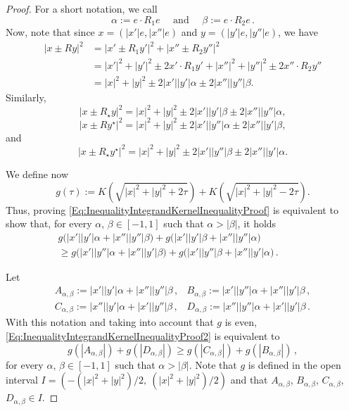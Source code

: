 \documentclass[12pt,reqno]{amsart}
\theoremstyle{definition}
\theoremstyle{remark}
\newcommand{\bpar}[1]{\left ( {#1}\right )}
\numberwithin{equation}{section}
\begin{document}
\begin{proof}
		
		For a short notation, we call
		\begin{equation}
		\label{Eq:DefAlphaBeta}
		\alpha := e \cdot R_1 e  \quad \text{ and } \quad \beta := e \cdot R_2 e\,.
		\end{equation}
		Now, note that since  $x = (|x'|e, |x''|e)$ and $y = (|y'|e, |y''|e)$, we have
		\begin{align*}
		|x \pm Ry|^2&= |x' \pm R_1y'|^2 + |x'' \pm R_2y''|^2 \\
		&= |x'|^2 + |y'|^2 \pm 2 x'\cdot R_1 y' +  |x''|^2 + |y''|^2 \pm 2 x''\cdot R_2 y''\\
		&= |x|^2 + |y|^2 \pm 2 |x'||y'| \alpha \pm 2 |x''||y''| \beta.
		\end{align*}
		Similarly,
		$$
		|x \pm R_\star y|^2 =  |x|^2 + |y|^2 \pm 2 |x'||y'| \beta \pm 2 |x''||y''|\alpha,
		$$
		$$
		|x \pm R y^\star|^2 =  |x|^2 + |y|^2 \pm 2 |x'||y''| \alpha \pm 2 |x''||y'|\beta,
		$$
		and
		$$
		|x \pm R_\star y^\star|^2 = |x|^2 + |y|^2 \pm 2 |x'||y''| \beta \pm 2 |x''||y'| \alpha.
		$$
		
		We define now
		$$
		g(\tau) := K \bpar{\sqrt{|x|^2 + |y|^2 + 2 \tau }} + K \bpar{\sqrt{|x|^2 + |y|^2 - 2 \tau}}.
		$$
		Thus, proving \eqref{Eq:InequalityIntegrandKernelInequalityProof} is equivalent to show that, for every $\alpha$, $\beta \in [-1,1]$ such that $\alpha > |\beta|$, it holds
		\begin{equation}
		\label{Eq:InequalityIntegrandKernelInequalityProof2}
		\begin{split}
		g\Big(|x'||y'| \alpha + |x''||y''| \beta \Big)
		+ g\Big(|x'||y'| \beta + |x''||y''| \alpha \Big) \hspace{2cm}
		\\ \geq
		g\Big(|x'||y''| \alpha + |x''||y'|\beta \Big)
		+ g\Big(|x'||y''| \beta + |x''||y'| \alpha \Big)\,.
		\end{split}
		\end{equation}
		
		Let
		$$
		\begin{array}{cc}
		A_{\alpha,\beta} := |x'||y'|  \alpha + |x''||y''|\beta \,, &
		B_{\alpha,\beta} := |x'||y''| \alpha + |x''||y'| \beta \,, \\
		C_{\alpha,\beta} := |x''||y'| \alpha + |x'||y''| \beta \,, &
		D_{\alpha,\beta} := |x''||y''|\alpha + |x'||y'|  \beta \,.
		\end{array}
		$$
		With this notation and taking into account that $g$ is even,
		\eqref{Eq:InequalityIntegrandKernelInequalityProof2} is equivalent to
		\begin{equation}
		\label{Eq:InequalityIntegrandKernelInequalityProof3}
		g(|A_{\alpha,\beta}|) + g(|D_{\alpha,\beta}|) \geq g(|C_{\alpha,\beta}|) + g(|B_{\alpha,\beta}|)\,,
		\end{equation}
		for every $\alpha$, $\beta \in [-1,1]$ such that $\alpha > |\beta|$. Note that $g$ is defined in the open interval $I = (-(|x|^2 + |y|^2)/2,\ (|x|^2 + |y|^2)/2)$ and that $A_{\alpha,\beta}$, $B_{\alpha,\beta}$, $C_{\alpha,\beta}$, $D_{\alpha,\beta} \in I$.
		

\end{proof}
\end{document}
